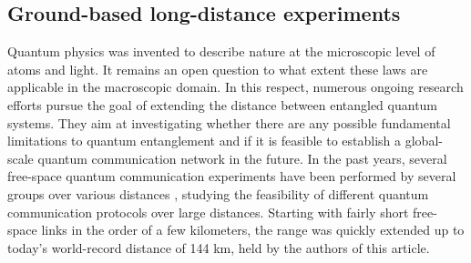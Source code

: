 \documentclass{article}
\begin{document}
\subsection{Ground-based long-distance experiments}
Quantum physics was invented to describe nature at the microscopic level of atoms and light. It remains an open question to what extent these laws are applicable in the macroscopic domain. In this respect, numerous ongoing research efforts pursue the goal of extending the distance between entangled quantum systems. They aim at investigating whether there are any possible fundamental limitations to quantum entanglement and if it is feasible to establish a global-scale quantum communication network in the future. In the past years, several free-space quantum communication experiments have been performed by several groups over various distances \cite{aspelmeyer2003long,resch2005distributing, ursin2007entanglement,schmitt2007experimental,peng2005experimental,yin2012quantum}, studying the feasibility of different quantum communication protocols over large distances. Starting with fairly short free-space links in the order of a few kilometers, the range was quickly extended up to today's world-record distance of 144 km, held by the authors of this article.
\end{document}
